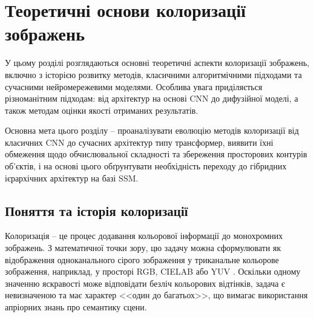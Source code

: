 
\chapter{Теоретичні основи колоризації зображень}
    \label{chap:review_theory}
        У цьому розділі розглядаються основні теоретичні аспекти колоризації зображень, включно з історією розвитку методів, класичними алгоритмічними підходами та сучасними нейромережевими моделями.
        Особлива увага приділяється різноманітним підходам: від архітектур на основі CNN до дифузійної моделі, а також методам оцінки якості отриманих результатів.

        Основна мета цього розділу -- проаналізувати еволюцію методів колоризації від класичних CNN до сучасних архітектур типу трансформер,
        виявити їхні обмеження щодо обчислювальної складності та збереження просторових контурів об'єктів,
        і на основі цього обґрунтувати необхідність переходу до гібридних ієрархічних архітектур на базі SSM.

    \section{Поняття та історія колоризації}

        Колоризація -- це процес додавання кольорової інформації до монохромних зображень.
        З математичної точки зору, цю задачу можна сформулювати як відображення одноканального сірого зображення у триканальне кольорове зображення, наприклад, у просторі RGB, CIELAB або YUV \cite{2025-survey}.
        Оскільки одному значенню яскравості може відповідати безліч кольорових відтінків, задача є невизначеною та має характер <<один до багатьох>>, що вимагає використання апріорних знань про семантику сцени.

